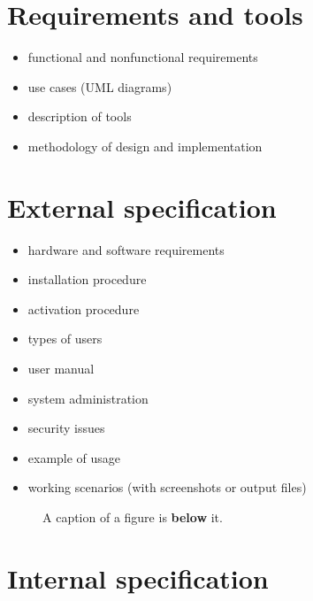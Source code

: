 \documentclass[a4paper,twoside,12pt]{book}
\begin{document}
\chapter{Requirements and tools}

\begin{itemize}
\item functional and nonfunctional requirements
\item use cases (UML diagrams)
\item description of tools
\item methodology of design and implementation
\end{itemize}


\chapter{External specification}
\begin{itemize}
\item hardware and software requirements
\item installation procedure
\item activation procedure
\item types of users
\item user manual
\item system administration
\item security issues
\item example of usage
\item working scenarios (with screenshots or output files)
\end{itemize}

\begin{figure}
\centering
{}
\caption{A caption of a figure is \textbf{below} it.}
\label{fig:2}
\end{figure}


\chapter{Internal specification}
\end{document}
